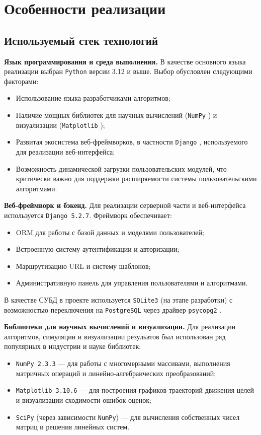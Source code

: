 
\section{Особенности реализации}

\subsection{Используемый стек технологий}

\textbf{Язык программирования и среда выполнения.} В качестве основного языка реализации выбран \texttt{Python} \cite{Python} версии 3.12 и выше. Выбор обусловлен следующими факторами:
\begin{itemize}
    \item Использование языка разработчиками алгоритмов;
    \item Наличие мощных библиотек для научных вычислений (\texttt{NumPy} \cite{NumPy}) и визуализации (\texttt{Matplotlib} \cite{Matplotlib});
    \item Развитая экосистема веб-фреймворков, в частности \texttt{Django} \cite{Django}, используемого для реализации веб-интерфейса;
    \item Возможность динамической загрузки пользовательских модулей, что критически важно для поддержки расширяемости системы пользовательскими алгоритмами.
\end{itemize}

\textbf{Веб-фреймворк и бэкенд.} Для реализации серверной части и веб-интерфейса используется \texttt{Django 5.2.7}. Фреймворк обеспечивает:
\begin{itemize}
    \item ORM для работы с базой данных и моделями пользователей;
    \item Встроенную систему аутентификации и авторизации;
    \item Маршрутизацию URL и систему шаблонов;
    \item Административную панель для управления пользователями и алгоритмами.
\end{itemize}

В качестве СУБД в проекте используется \texttt{SQLite3} \cite{sqlite3} (на этапе разработки) с возможностью переключения на \texttt{PostgreSQL} \cite{PostgreSQL} через драйвер \texttt{psycopg2} \cite{psycopg2}.

\textbf{Библиотеки для научных вычислений и визуализации.}
Для реализации алгоритмов, симуляции и визуализации резульатов был использован ряд популярных в индустрии и науке библиотек: 
\begin{itemize}
    \item \texttt{NumPy 2.3.3} --- для работы с многомерными массивами, выполнения матричных операций и линейно-алгебраических преобразований;
    \item \texttt{Matplotlib 3.10.6} --- для построения графиков траекторий движения целей и визуализации сходимости ошибок оценок;
    \item \texttt{SciPy} \cite{SciPy} (через зависимости \texttt{NumPy}) --- для вычисления собственных чисел матриц и решения линейных систем.
\end{itemize}

